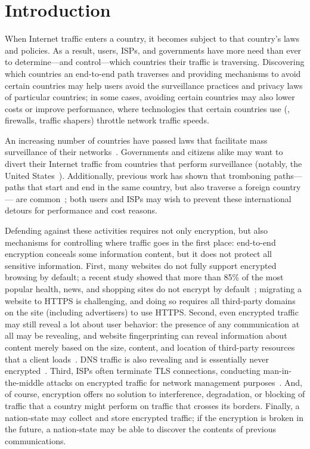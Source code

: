 \section{Introduction}
\label{intro}

When Internet traffic enters a country, it becomes subject to that country's
laws and policies.  As a result, users, ISPs, and governments have more need
than ever to determine---and control---which countries their traffic is
traversing.  Discovering which countries an end-to-end path traverses and
providing mechanisms to avoid certain countries may help users avoid the
surveillance practices and privacy laws of particular countries; in some
cases, avoiding certain countries may also lower costs or improve performance,
where technologies that certain countries use (\ie, firewalls, traffic
shapers) throttle network traffic speeds. 

An increasing number of countries have passed laws that facilitate mass
surveillance of their networks~\cite{france_surveillance,
netherlands_surveillance, kazak_surveillance, uk_bill}. Governments and
citizens alike may want to divert their Internet traffic from countries that
perform surveillance (notably, the United States~\cite{russia_secure_internet,
routing_errors, dte}).   Additionally, previous work has shown that tromboning
paths---paths that start and end in the same country, but also traverse a
foreign country--- are common~\cite{shah2015characterizing, gupta2014peering};
both users and ISPs may wish to prevent these international detours for
performance and cost reasons.

Defending against these activities requires not only encryption, but
also mechanisms for controlling where traffic goes in the first place:
end-to-end 
encryption conceals some information content, but it does not protect
all sensitive information.  First, many websites do not fully support
encrypted browsing by default; a recent study showed that more than 85\% of
the most popular health, news, and shopping sites do not encrypt by
default~\cite{what_isps_can_see}; migrating a website to HTTPS is challenging,
and doing so requires all third-party domains on the site (including
advertisers) to use HTTPS.  Second, even encrypted traffic may still reveal a
lot about user behavior: the presence of any communication at all may be
revealing, and website fingerprinting can reveal information about content
merely based on the size, content, and location of third-party resources that
a client loads~\cite{Johnson2013a}. DNS traffic is also revealing and is
essentially never encrypted~\cite{what_isps_can_see}.  Third, ISPs often
terminate TLS connections, conducting man-in-the-middle attacks on encrypted
traffic for network management purposes~\cite{mitm_isp}.  And, of course,
encryption offers no solution to interference, degradation, or blocking of
traffic that a country might perform on traffic that crosses its borders.
Finally, a nation-state may collect and store encrypted traffic; if the
encryption is broken in the future, a nation-state may be able to discover the
contents of previous communications.

